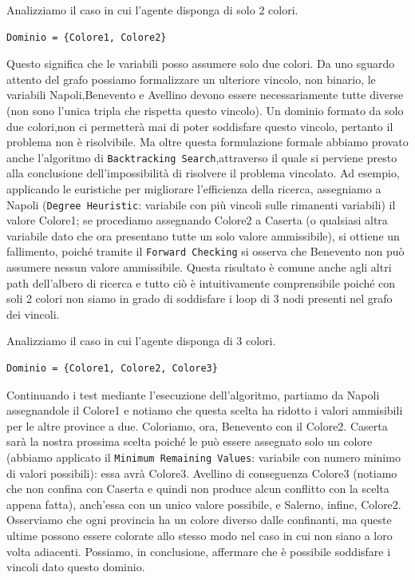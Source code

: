 		Analizziamo il caso in cui l'agente disponga di solo 2 colori.
		\begin{lstlisting}
Dominio = {Colore1, Colore2}
		\end{lstlisting}
		Questo significa che le variabili posso assumere solo due colori.
		Da uno sguardo attento del grafo possiamo formalizzare un ulteriore vincolo, non binario, le variabili Napoli,Benevento e Avellino devono essere necessariamente tutte diverse (non sono l'unica tripla che rispetta questo vincolo).
		Un dominio formato da solo due colori,non ci permetterà mai di poter soddisfare questo vincolo, pertanto il problema non è risolvibile. 
		Ma oltre questa formulazione formale abbiamo provato anche l'algoritmo di \texttt{Backtracking Search},attraverso il quale si perviene presto alla conclusione dell'impossibilità di risolvere il problema vincolato. Ad esempio, applicando le euristiche per migliorare l'efficienza della ricerca, assegniamo a Napoli (\texttt{Degree Heuristic}: variabile con più vincoli sulle rimanenti variabili) il valore Colore1; se procediamo assegnando Colore2 a Caserta (o qualsiasi altra variabile dato che ora presentano tutte un solo valore ammissibile), si ottiene un fallimento, poiché tramite il \texttt{Forward Checking} si osserva che Benevento non può assumere nessun valore ammissibile. Questa risultato è comune anche agli altri path dell'albero di ricerca e tutto ciò è intuitivamente comprensibile poiché con soli 2 colori non siamo in grado di soddisfare i loop di 3 nodi presenti nel grafo dei vincoli.\par
		Analizziamo il caso in cui l'agente disponga di 3 colori.
		\begin{lstlisting}
Dominio = {Colore1, Colore2, Colore3}
		\end{lstlisting}
		Continuando i test mediante l'esecuzione dell'algoritmo, partiamo da Napoli assegnandole il Colore1 e notiamo che questa scelta ha ridotto i valori ammisibili per le altre province a due. Coloriamo, ora, Benevento con il Colore2. Caserta sarà la nostra prossima scelta poiché le può essere assegnato solo un colore (abbiamo applicato il \texttt{Minimum Remaining Values}: variabile con numero minimo di valori possibili): essa avrà Colore3. Avellino di conseguenza Colore3 (notiamo che non confina con Caserta e quindi non produce alcun conflitto con la scelta appena fatta), anch'essa con un unico valore possibile, e Salerno, infine, Colore2. Osserviamo che ogni provincia ha un colore diverso dalle confinanti, ma queste ultime  possono essere colorate allo stesso modo nel caso in cui non siano a loro volta adiacenti. Possiamo, in conclusione, affermare che è possibile soddisfare i vincoli dato questo dominio.
